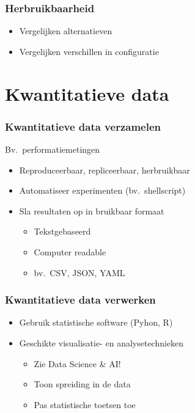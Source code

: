 \documentclass[aspectratio=169]{beamer}
\begin{document}
\begin{frame}
  \frametitle{Herbruikbaarheid}


  \bigskip

  \begin{itemize}
    \item Vergelijken alternatieven
    \item Vergelijken verschillen in configuratie
  \end{itemize}

\end{frame}

\section{Kwantitatieve data}

\begin{frame}
  \frametitle{Kwantitatieve data verzamelen}

  Bv.\ performatiemetingen

  \begin{itemize}
    \item Reproduceerbaar, repliceerbaar, herbruikbaar
    \item Automatiseer experimenten (bv.\ shellscript)
    \item Sla resultaten op in bruikbaar formaat
      \begin{itemize}
        \item Tekstgebaseerd
        \item Computer readable
        \item bv.\ CSV, JSON, YAML
      \end{itemize}
  \end{itemize}

\end{frame}

\begin{frame}
  \frametitle{Kwantitatieve data verwerken}

  \begin{itemize}
    \item Gebruik statistische software (Pyhon, R)
    \item Geschikte visualisatie- en analysetechnieken
      \begin{itemize}
        \item Zie Data Science \& AI!
        \item Toon spreiding in de data
        \item Pas statistische toetsen toe
      \end{itemize}
  \end{itemize}

\end{frame}
  
\end{document}

